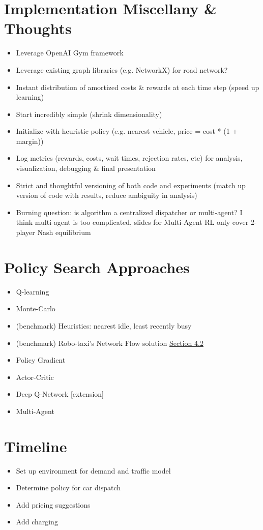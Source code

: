 \documentclass[12pt]{article}
\begin{document}
\section*{Implementation Miscellany \& Thoughts}
\begin{itemize}
		\item Leverage OpenAI Gym framework
		\item Leverage existing graph libraries (e.g. NetworkX) for road network?
		\item Instant distribution of amortized costs \& rewards at each time step (speed up learning)
		\item Start incredibly simple (shrink dimensionality)
		\item Initialize with heuristic policy (e.g. nearest vehicle, price = cost * (1 + margin))
		\item Log metrics (rewards, costs, wait times, rejection rates, etc) for analysis,
				visualization, debugging \& final presentation
		\item Strict and thoughtful versioning of both code and experiments (match up version
				of code with results, reduce ambiguity in analysis)
        \item Burning question: is algorithm a centralized dispatcher or multi-agent? I think multi-agent is too complicated, slides for Multi-Agent RL only cover 2-player Nash equilibrium
\end{itemize}

\section*{Policy Search Approaches}
\begin{itemize}
        \item Q-learning
        \item Monte-Carlo
        \item (benchmark) Heuristics: nearest idle, least recently busy
        \item (benchmark) Robo-taxi's Network Flow solution \href{https://arxiv.org/html/2504.06125v2#S4:~:text=4.2,Flow%20Problem%20Formulation}{Section 4.2} %
        \item Policy Gradient
        \item Actor-Critic
        \item Deep Q-Network [extension]
        \item Multi-Agent
\end{itemize}

\section*{Timeline}
\begin{itemize}
    \item Set up environment for demand and traffic model
    \item Determine policy for car dispatch
    \item Add pricing suggestions
    \item Add charging
\end{itemize}
\end{document}
